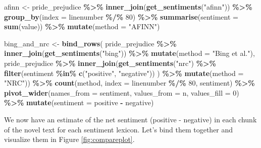 \documentclass[
]{book}
\newenvironment{Shaded}{\begin{snugshade}}{\end{snugshade}}
\newcommand{\AttributeTok}[1]{\textcolor[rgb]{0.13,0.29,0.53}{#1}}
\newcommand{\DecValTok}[1]{\textcolor[rgb]{0.00,0.00,0.81}{#1}}
\newcommand{\FunctionTok}[1]{\textcolor[rgb]{0.13,0.29,0.53}{\textbf{#1}}}
\newcommand{\NormalTok}[1]{#1}
\newcommand{\OtherTok}[1]{\textcolor[rgb]{0.56,0.35,0.01}{#1}}
\newcommand{\SpecialCharTok}[1]{\textcolor[rgb]{0.81,0.36,0.00}{\textbf{#1}}}
\newcommand{\StringTok}[1]{\textcolor[rgb]{0.31,0.60,0.02}{#1}}
\begin{document}
\begin{Shaded}
\begin{Highlighting}[]
\NormalTok{afinn }\OtherTok{\textless{}{-}}\NormalTok{ pride\_prejudice }\SpecialCharTok{\%\textgreater{}\%} 
  \FunctionTok{inner\_join}\NormalTok{(}\FunctionTok{get\_sentiments}\NormalTok{(}\StringTok{"afinn"}\NormalTok{)) }\SpecialCharTok{\%\textgreater{}\%} 
  \FunctionTok{group\_by}\NormalTok{(}\AttributeTok{index =}\NormalTok{ linenumber }\SpecialCharTok{\%/\%} \DecValTok{80}\NormalTok{) }\SpecialCharTok{\%\textgreater{}\%} 
  \FunctionTok{summarise}\NormalTok{(}\AttributeTok{sentiment =} \FunctionTok{sum}\NormalTok{(value)) }\SpecialCharTok{\%\textgreater{}\%} 
  \FunctionTok{mutate}\NormalTok{(}\AttributeTok{method =} \StringTok{"AFINN"}\NormalTok{)}

\NormalTok{bing\_and\_nrc }\OtherTok{\textless{}{-}} \FunctionTok{bind\_rows}\NormalTok{(}
\NormalTok{  pride\_prejudice }\SpecialCharTok{\%\textgreater{}\%} 
    \FunctionTok{inner\_join}\NormalTok{(}\FunctionTok{get\_sentiments}\NormalTok{(}\StringTok{"bing"}\NormalTok{)) }\SpecialCharTok{\%\textgreater{}\%}
    \FunctionTok{mutate}\NormalTok{(}\AttributeTok{method =} \StringTok{"Bing et al."}\NormalTok{),}
\NormalTok{  pride\_prejudice }\SpecialCharTok{\%\textgreater{}\%} 
    \FunctionTok{inner\_join}\NormalTok{(}\FunctionTok{get\_sentiments}\NormalTok{(}\StringTok{"nrc"}\NormalTok{) }\SpecialCharTok{\%\textgreater{}\%} 
                 \FunctionTok{filter}\NormalTok{(sentiment }\SpecialCharTok{\%in\%} \FunctionTok{c}\NormalTok{(}\StringTok{"positive"}\NormalTok{, }
                                         \StringTok{"negative"}\NormalTok{))}
\NormalTok{    ) }\SpecialCharTok{\%\textgreater{}\%}
    \FunctionTok{mutate}\NormalTok{(}\AttributeTok{method =} \StringTok{"NRC"}\NormalTok{)) }\SpecialCharTok{\%\textgreater{}\%}
  \FunctionTok{count}\NormalTok{(method, }\AttributeTok{index =}\NormalTok{ linenumber }\SpecialCharTok{\%/\%} \DecValTok{80}\NormalTok{, sentiment) }\SpecialCharTok{\%\textgreater{}\%}
  \FunctionTok{pivot\_wider}\NormalTok{(}\AttributeTok{names\_from =}\NormalTok{ sentiment,}
              \AttributeTok{values\_from =}\NormalTok{ n,}
              \AttributeTok{values\_fill =} \DecValTok{0}\NormalTok{) }\SpecialCharTok{\%\textgreater{}\%} 
  \FunctionTok{mutate}\NormalTok{(}\AttributeTok{sentiment =}\NormalTok{ positive }\SpecialCharTok{{-}}\NormalTok{ negative)}
\end{Highlighting}
\end{Shaded}

We now have an estimate of the net sentiment (positive - negative) in each chunk of the novel text for each sentiment lexicon. Let's bind them together and visualize them in Figure \ref{fig:compareplot}.
\end{document}
